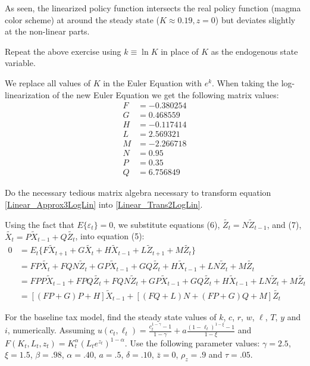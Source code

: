 \documentclass[letterpaper,11pt]{article}
\theoremstyle{definition}
\begin{document}
\begin{spacing}{1.5}
	As seen, the linearized policy function intersects the real policy function (magma color scheme) at around the steady state ($K \approx 0.19, z = 0$) but deviates slightly at the non-linear parts.

	\begin{Exercise} \label{Linear_HW_BM_Coeffs_Log}
		Repeat the above exercise using $k \equiv \ln K$ in place of $K$ as the endogenous state variable.
	\end{Exercise}

	We replace all values of $K$ in the Euler Equation with $e^k$. When taking the log-linearization of the new Euler Equation we get the following matrix values:
	\begin{align*}
		F&= -0.380254 \\
		G&= 0.468559 \\
		H&= -0.117414 \\
		L&= 2.569321 \\
		M&= -2.266718 \\
		N&=0.95 \\
		P&= 0.35 \\
		Q&= 6.756849
	\end{align*}

	\begin{Exercise} \label{Linear_HW_Algebra}
		Do the necessary tedious matrix algebra necessary to transform equation \eqref{Linear_Approx3LogLin} into \eqref{Linear_Trans2LogLin}.
	\end{Exercise}

	Using the fact that $E\{\varepsilon_t\}=0$, we substitute equations (6), $\tilde{Z_t}=N\tilde{Z}_{t-1}$, and (7), $\tilde{X_t} = P\tilde{X}_{t-1}+Q\tilde{Z_t}$, into equation (5):
	\begin{align*}
		0 &= E_t\{F\tilde{X}_{t+1}+G\tilde{X_t}+H\tilde{X}_{t-1}+L\tilde{Z}_{t+1}+M\tilde{Z_t}\} \\
		&= FP\tilde{X_t}+FQN\tilde{Z}_{t}+GP\tilde{X}_{t-1}+GQ\tilde{Z_t}+H\tilde{X}_{t-1}+LN\tilde{Z}_{t}+M\tilde{Z_t} \\
		&= FPP\tilde{X}_{t-1}+FPQ\tilde{Z_t}+FQN\tilde{Z}_{t}+GP\tilde{X}_{t-1}+GQ\tilde{Z_t}+H\tilde{X}_{t-1}+LN\tilde{Z}_{t}+M\tilde{Z_t}\\
		&= [(FP+G)P+H]\tilde{X}_{t-1}+[(FQ+L)N+(FP+G)Q+M]\tilde{Z_t}
	\end{align*}

	\begin{Exercise} \label{Linear_HW_Base_Numer_SS}
		For the baseline tax model, find the steady state values of $k$, $c$, $r$, $w$, $\ell$, $T$, $y$ and $i$, numerically.  Assuming $u(c_t,\ell_t) = \frac{c^{1-\gamma}_t -1}{1-\gamma}+ a \frac{(1-\ell_t)^{1-\xi}-1}{1-\xi}$ and $F(K_t,L_t,z_t) = K^{\alpha}_t (L_te^{z_t})^{1-\alpha} $.  Use the following parameter values: $\gamma = 2.5$, $\xi = 1.5$,  $\beta = .98$, $\alpha = .40$, $a=.5$, $\delta = .10$, $\bar z = 0$, $\rho_z=.9$ and $\tau = .05$.
	\end{Exercise}


\end{spacing}
\end{document}
